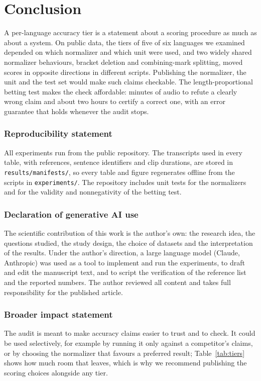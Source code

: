 \section{Conclusion}
\label{sec:conclusion}

A per-language accuracy tier is a statement about a scoring procedure as much as about a system. On public data, the tiers of five of six languages we examined depended on which normalizer and which unit were used, and two widely shared normalizer behaviours, bracket deletion and combining-mark splitting, moved scores in opposite directions in different scripts. Publishing the normalizer, the unit and the test set would make such claims checkable. The length-proportional betting test makes the check affordable: minutes of audio to refute a clearly wrong claim and about two hours to certify a correct one, with an error guarantee that holds whenever the audit stops.

\subsubsection*{Reproducibility statement}
All experiments run from the public repository. The transcripts used in every table, with references, sentence identifiers and clip durations, are stored in \texttt{results/manifests/}, so every table and figure regenerates offline from the scripts in \texttt{experiments/}. The repository includes unit tests for the normalizers and for the validity and nonnegativity of the betting test.

\subsubsection*{Declaration of generative AI use}
The scientific contribution of this work is the author's own: the research idea, the questions studied, the study design, the choice of datasets and the interpretation of the results. Under the author's direction, a large language model (Claude, Anthropic) was used as a tool to implement and run the experiments, to draft and edit the manuscript text, and to script the verification of the reference list and the reported numbers. The author reviewed all content and takes full responsibility for the published article.

\subsubsection*{Broader impact statement}
The audit is meant to make accuracy claims easier to trust and to check. It could be used selectively, for example by running it only against a competitor's claims, or by choosing the normalizer that favours a preferred result; Table~\ref{tab:tiers} shows how much room that leaves, which is why we recommend publishing the scoring choices alongside any tier.

